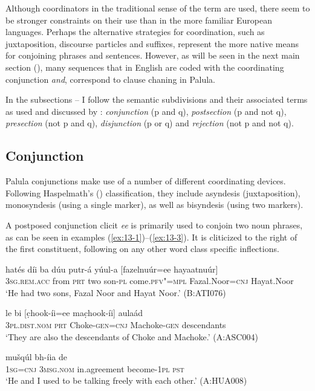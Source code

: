 Although coordinators in the traditional sense of the term are used, there seem to be stronger constraints on their use than in the more familiar European languages. Perhaps the alternative strategies for coordination, such as juxtaposition, discourse particles and suffixes, represent the more native means for conjoining phrases and sentences. However, as will be seen in the next main section (), many sequences that in English are coded with the coordinating conjunction \textit{and}, correspond to clause chaning in Palula.



In the subsections -- I follow the semantic subdivisions and their associated terms as used and discussed by \citet{payne1985}: \textit{conjunction} (p and q), \textit{postsection} (p and not q), \textit{presection} (not p and q), \textit{disjunction} (p or q) and \textit{rejection} (not p and not q).


\subsection{Conjunction}
\label{subsec:13-2-1}

Palula conjunctions make use of a number of different coordinating devices. Following Haspelmath's (\citeyear{haspelmath2007}) classification, they include asyndesis (juxtaposition), monosyndesis (using a single marker), as well as bisyndesis (using two markers).

 A postposed conjunction clicit \textit{ee} is primarily used to conjoin two noun phrases, as can be seen in examples (\ref{ex:13-1})--(\ref{ex:13-3}). It is cliticized to the right of the first constituent, following on any other word class specific inflections.

\begin{exe}
\ex
\label{ex:13-1}
\gll hatés díi ba dúu putr-á yúul-a [fazelnuúr=ee hayaatnuúr] \\
\textsc{3sg.rem.acc} from \textsc{prt} two son-\textsc{pl} come.\textsc{pfv"=mpl} Fazal.Noor=\textsc{cnj} Hayat.Noor\\
\glt `He had two sons, Fazal Noor and Hayat Noor.' (B:ATI076) 

\ex
\label{ex:13-2}
\gll le bi [c̣hook-íi=ee mac̣hook-íi] aulaád \\
\textsc{3pl.dist.nom} \textsc{prt} Choke-\textsc{gen=cnj} Machoke-\textsc{gen} descendants\\
\glt `They are also the descendants of Choke and Machoke.' (A:ASC004)

\ex
\label{ex:13-3}
\gll [máa=ee so] mušqúl bh-íia de  \\
\textsc{1sg}=\textsc{cnj} \textsc{3msg.nom} in.agreement become-\textsc{1pl} \textsc{pst} \\
\glt `He and I used to be talking freely with each other.' (A:HUA008) 
\end{exe}

